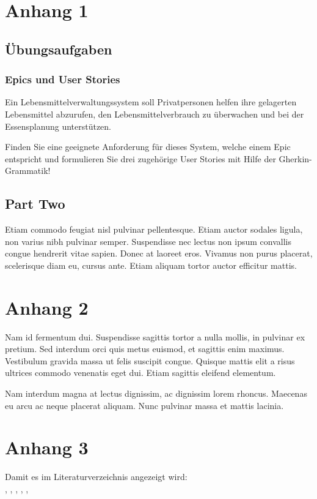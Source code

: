 \documentclass[acmtog]{acmart}
\begin{document}



\appendix

\section{Anhang 1}

\subsection{Übungsaufgaben}
\subsubsection{Epics und User Stories}
Ein Lebensmittelverwaltungssystem soll Privatpersonen helfen ihre gelagerten Lebensmittel abzurufen,
den Lebensmittelverbrauch zu überwachen und bei der Essensplanung unterstützen.

Finden Sie eine geeignete Anforderung für dieses System, welche einem Epic entspricht und formulieren Sie drei zugehörige
User Stories mit Hilfe der Gherkin-Grammatik!


\subsection{Part Two}

Etiam commodo feugiat nisl pulvinar pellentesque. Etiam auctor sodales
ligula, non varius nibh pulvinar semper. Suspendisse nec lectus non
ipsum convallis congue hendrerit vitae sapien. Donec at laoreet
eros. Vivamus non purus placerat, scelerisque diam eu, cursus
ante. Etiam aliquam tortor auctor efficitur mattis.

\section{Anhang 2}

Nam id fermentum dui. Suspendisse sagittis tortor a nulla mollis, in
pulvinar ex pretium. Sed interdum orci quis metus euismod, et sagittis
enim maximus. Vestibulum gravida massa ut felis suscipit
congue. Quisque mattis elit a risus ultrices commodo venenatis eget
dui. Etiam sagittis eleifend elementum.

Nam interdum magna at lectus dignissim, ac dignissim lorem
rhoncus. Maecenas eu arcu ac neque placerat aliquam. Nunc pulvinar
massa et mattis lacinia.

\section{Anhang 3}

Damit es im Literaturverzeichnis angezeigt wird:\\
\cite{erbert08}, \cite{sommerville16}, \cite{balzert09}, \cite{wiegers13},
\cite{pohl15}, \cite{martin13}
\end{document}
